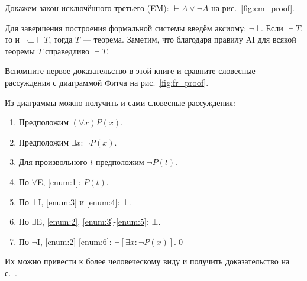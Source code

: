 Докажем закон исключённого третьего (EM): $\vdash A\lor \lnot A$ на
рис.~\ref{fig:em_proof}.


Для завершения построения формальной системы
введём аксиому: $\lnot\bot$. Если $\vdash T$, то и $\lnot\bot\vdash T$,
тогда $T$ --- теорема. Заметим, что благодаря правилу AI для всякой
теоремы $T$ справедливо $\vdash T$.

Вспомните первое доказательство в этой книге и
сравните словесные рассуждения с
диаграммой Фитча на рис.~\ref{fig:fr_proof}.

Из диаграммы можно получить и сами словесные рассуждения:
\begin{enumerate}[label=(\arabic*)]
	\item{}Предположим $(\forall x)P(x)$.\label{enum:1}
	\item{}Предположим $\exists x:\lnot P(x)$.\label{enum:2}
	\item{}Для произвольного $t$ предположим $\lnot P(t)$.\label{enum:3}
	\item{}По $\forall$E, \ref{enum:1}: $P(t)$.\label{enum:4}
	\item{}По $\bot$I, \ref{enum:3} и \ref{enum:4}: $\bot$.\label{enum:5}
	\item{}По $\exists$E, \ref{enum:2}, \ref{enum:3}-\ref{enum:5}: $\bot$.\label{enum:6}
	\item{}По $\lnot$I, \ref{enum:2}-\ref{enum:6}: $\lnot[\exists x:\lnot P(x)]$.\qed
\end{enumerate}

Их можно привести к более человеческому виду и получить доказательство на
с.~\pageref{wordproof}.



